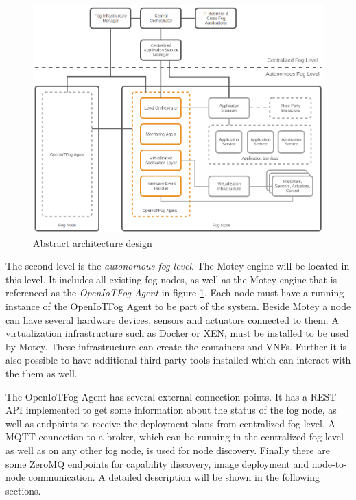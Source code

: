 \begin{figure}[H]
    \centering
    \includegraphics[width=\textwidth]{resources/images/initial_structure.png}
    \caption[Abstract architecture design]{Abstract architecture design}
    \label{fig:abstract_architecture_design}
\end{figure}

The second level is the \textit{autonomous fog level}.
The Motey engine will be located in this level.
It includes all existing fog nodes, as well as the Motey engine that is referenced as the \textit{OpenIoTFog Agent} in figure \ref{fig:abstract_architecture_design}.
Each node must have a running instance of the OpenIoTFog Agent to be part of the system.
Beside Motey a node can have several hardware devices, sensors and actuators connected to them.
A virtualization infrastructure such as Docker or XEN, must be installed to be used by Motey.
These infrastructure can create the containers and \acp{VNF}.
Further it is also possible to have additional third party tools installed which can interact with the them as well.

The OpenIoTFog Agent has several external connection points.
It has a \ac{REST} \ac{API} implemented to get some information about the status of the fog node, as well as endpoints to receive the deployment plans from centralized fog level.
A \ac{MQTT} connection to a broker, which can be running in the centralized fog level as well as on any other fog node, is used for node discovery.
Finally there are some ZeroMQ endpoints for capability discovery, image deployment and node-to-node communication.
A detailed description will be shown in the following sections.

